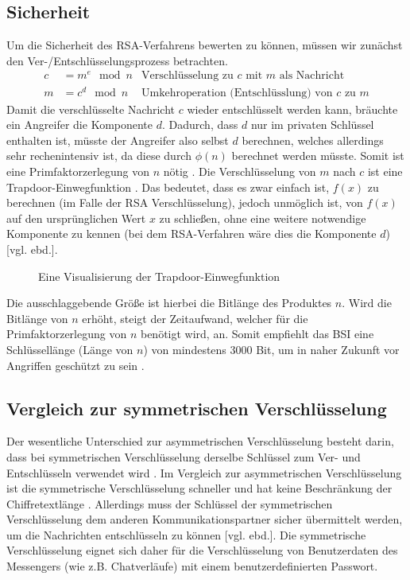 \documentclass[a4paper,ngerman, headheight=28pt,12pt, footheight=27pt]{scrartcl}
\newcommand{\vcite}[1]{\cite[vgl.][]{#1}}
\newcommand{\vebd}{[vgl. ebd.]}
\begin{document}
\subsection{Sicherheit}
Um die Sicherheit des RSA-Verfahrens bewerten zu können, müssen wir zunächst den Ver-/Entschlüsselungsprozess betrachten.
\begin{equation*}
  \begin{aligned}
    c & = m^e \mod n & \text{Verschlüsselung zu $c$ mit $m$ als Nachricht}    \\
    m & = c^d \mod n & \text{Umkehroperation (Entschlüsslung) von $c$ zu $m$}
  \end{aligned}
\end{equation*}
Damit die verschlüsselte Nachricht $c$ wieder entschlüsselt werden kann, bräuchte ein Angreifer die Komponente $d$. Dadurch, dass $d$ nur im privaten Schlüssel enthalten ist, müsste der Angreifer also selbst $d$ berechnen, welches allerdings sehr rechenintensiv ist, da diese durch $\phi(n)$ berechnet werden müsste. Somit ist eine Primfaktorzerlegung von $n$ nötig \vcite{EulersTotientFunction}. Die Verschlüsselung von $m$ nach $c$ ist eine Trapdoor-Einwegfunktion \vcite{RsaTrapdoor}. Das bedeutet, dass es zwar einfach ist, $f(x)$ zu berechnen (im Falle der RSA Verschlüsselung), jedoch unmöglich ist, von $f(x)$ auf den ursprünglichen Wert $x$ zu schließen, ohne eine weitere notwendige Komponente zu kennen (bei dem RSA-Verfahren wäre dies die Komponente $d$) \vebd.
\begin{figure}[H]
  \centering
  
  \caption{Eine Visualisierung der Trapdoor-Einwegfunktion \vcite{fig:TrapdoorPermutation} \label{fig:TrapdoorFunc}}
\end{figure}
Die ausschlaggebende Größe ist hierbei die Bitlänge des Produktes $n$. Wird die Bitlänge von $n$ erhöht, steigt der Zeitaufwand, welcher für die Primfaktorzerlegung von $n$ benötigt wird, an. Somit empfiehlt das BSI eine Schlüssellänge (Länge von $n$) von mindestens 3000 Bit, um in naher Zukunft vor Angriffen geschützt zu sein \vcite{RsaKeyLength}.
\subsection{Vergleich zur symmetrischen Verschlüsselung}
Der wesentliche Unterschied zur asymmetrischen Verschlüsselung besteht darin, dass bei symmetrischen Verschlüsselung derselbe Schlüssel zum Ver- und Entschlüsseln verwendet wird \vcite{GeneralSymmetricCryptography}. Im Vergleich zur asymmetrischen Verschlüsselung ist die symmetrische Verschlüsselung schneller und hat keine Beschränkung der Chiffretextlänge \vcite{RsaAESAnalysis, OpensslRsaMaxLength}. Allerdings muss der Schlüssel der symmetrischen Verschlüsselung dem anderen Kommunikationspartner sicher übermittelt werden, um die Nachrichten entschlüsseln zu können \vebd.
Die symmetrische Verschlüsselung eignet sich daher für die Verschlüsselung von Benutzerdaten des Messengers (wie z.B. Chatverläufe) mit einem benutzerdefinierten Passwort.
\end{document}
